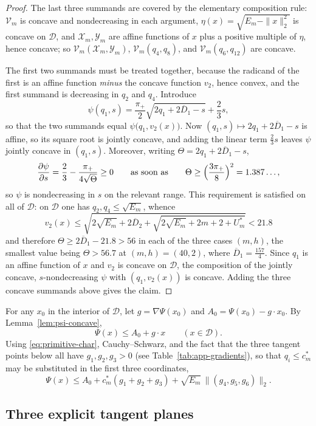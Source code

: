 \documentclass[11pt]{article}
\theoremstyle{definition}
\theoremstyle{remark}
\numberwithin{equation}{section}
\newcommand{\cV}{\mathcal V}
\newcommand{\cX}{\mathcal X}
\newcommand{\cY}{\mathcal Y}
\newcommand{\Db}{\overline D}
\begin{document}
\begin{proof}
The last three summands are covered by the elementary composition rule: $\cV_m$ is
concave and nondecreasing in each argument, $\eta(x)=\sqrt{E_m-\|x\|_2^2}$ is
concave on $\mathcal D$, and $\cX_m,\cY_m$ are affine functions of $x$ plus a positive
multiple of $\eta$, hence concave; so $\cV_m(\cX_m,\cY_m)$, $\cV_m(q_4,q_8)$, and
$\cV_m(q_6,q_{12})$ are concave.

The first two summands must be treated together, because the radicand of the
first is an affine function \emph{minus} the concave function $v_2$, hence convex,
and the first summand is decreasing in $q_2$ and $q_4$. Introduce
\[
  \psi(q_1,s)=\frac{\pi_+}2\sqrt{2q_1+2\Db_1-s}+\frac23s ,
\]
so that the two summands equal $\psi\bigl(q_1,v_2(x)\bigr)$. Now
$(q_1,s)\mapsto2q_1+2\Db_1-s$ is affine, so its square root is jointly concave, and
adding the linear term $\tfrac23s$ leaves $\psi$ jointly concave in $(q_1,s)$.
Moreover, writing $\Theta=2q_1+2\Db_1-s$,
\[
  \frac{\partial\psi}{\partial s}=\frac23-\frac{\pi_+}{4\sqrt\Theta}\ge0
  \qquad\text{as soon as}\qquad
  \Theta\ge\Bigl(\frac{3\pi_+}8\Bigr)^2=1.387\ldots,
\]
so $\psi$ is nondecreasing in $s$ on the relevant range. This requirement is satisfied on all of $\mathcal D$:
on $\mathcal D$ one has $q_2,q_4\le\sqrt{E_m}$, whence
\[
  v_2(x)\le\sqrt{2\sqrt{E_m}+2\Db_2+\sqrt{2\sqrt{E_m}+2m+2+U_m^*}}<21.8
\]
and therefore $\Theta\ge2\Db_1-21.8>56$ in each of the three cases $(m,h)$, the smallest value being $\Theta>56.7$ at $(m,h)=(40,2)$, where $\Db_1=\tfrac{157}4$. Since $q_1$ is
an affine function of $x$ and $v_2$ is concave on $\mathcal D$, the composition of the
jointly concave, $s$-nondecreasing $\psi$ with $(q_1,v_2(x))$ is concave. Adding the
three concave summands above gives the claim.
\end{proof}

For any $x_0$ in the interior of $\mathcal D$, let $g=\nabla\Psi(x_0)$ and $A_0=\Psi(x_0)-g\cdot x_0$. By Lemma~\ref{lem:psi-concave},
\[
  \Psi(x)\le A_0+g\cdot x
  \qquad(x\in\mathcal D).
\]
Using \eqref{eq:primitive-char}, Cauchy--Schwarz, and the fact that the three
tangent points below all have $g_1,g_2,g_3>0$ (see Table~\ref{tab:app-gradients}), so that $q_i\le c_m^*$ may be substituted in the
first three coordinates,
\begin{equation}\label{eq:tangent-master}
  \Psi(x)
  \le A_0+c_m^*(g_1+g_2+g_3)
  +\sqrt{E_m}\,\|(g_4,g_5,g_6)\|_2.
\end{equation}

\subsection{Three explicit tangent planes}
\end{document}
